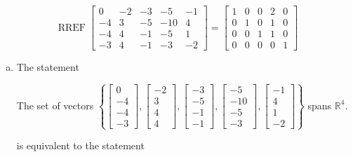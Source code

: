 \begin{exerciseAnswer} 


\[\operatorname{RREF} \left[\begin{array}{ccccc}
0 & -2 & -3 & -5 & -1 \\
-4 & 3 & -5 & -10 & 4 \\
-4 & 4 & -1 & -5 & 1 \\
-3 & 4 & -1 & -3 & -2
\end{array}\right] = \left[\begin{array}{ccccc}
1 & 0 & 0 & 2 & 0 \\
0 & 1 & 0 & 1 & 0 \\
0 & 0 & 1 & 1 & 0 \\
0 & 0 & 0 & 0 & 1
\end{array}\right] \]


\begin{enumerate}[(a)]
\item The statement 
\begin{center}\begin{minipage}{0.8\textwidth}
 The set of vectors \( \left\{ \left[\begin{array}{c}
0 \\
-4 \\
-4 \\
-3
\end{array}\right] , \left[\begin{array}{c}
-2 \\
3 \\
4 \\
4
\end{array}\right] , \left[\begin{array}{c}
-3 \\
-5 \\
-1 \\
-1
\end{array}\right] , \left[\begin{array}{c}
-5 \\
-10 \\
-5 \\
-3
\end{array}\right] , \left[\begin{array}{c}
-1 \\
4 \\
1 \\
-2
\end{array}\right] \right\} \) spans \(\mathbb{R}^4\). 
\end{minipage}\end{center}
     is equivalent to the statement 

\end{enumerate}
\end{exerciseAnswer}

